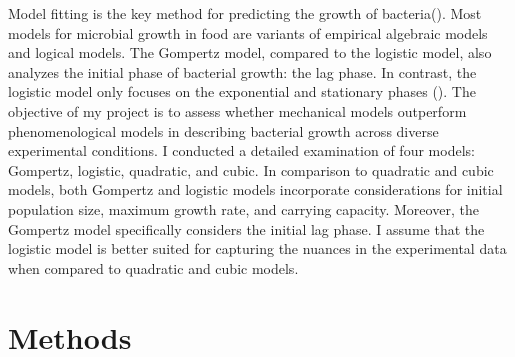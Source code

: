 \documentclass[11pt]{article}
\begin{document}
Model fitting is the key method for predicting the growth of bacteria(\cite{levins_1966}). Most models for microbial growth in food are variants of empirical algebraic models and logical models. The Gompertz model, compared to the logistic model, also analyzes the initial phase of bacterial growth: the lag phase. In contrast, the logistic model only focuses on the exponential and stationary phases (\cite{peleg_2011}). The objective of my project is to assess whether mechanical models outperform phenomenological models in describing bacterial growth across diverse experimental conditions. I conducted a detailed examination of four models: Gompertz, logistic, quadratic, and cubic. In comparison to quadratic and cubic models, both Gompertz and logistic models incorporate considerations for initial population size, maximum growth rate, and carrying capacity. Moreover, the Gompertz model specifically considers the initial lag phase. I assume that the logistic model is better suited for capturing the nuances in the experimental data when compared to quadratic and cubic models.\par

\section{Methods}
\end{document}
